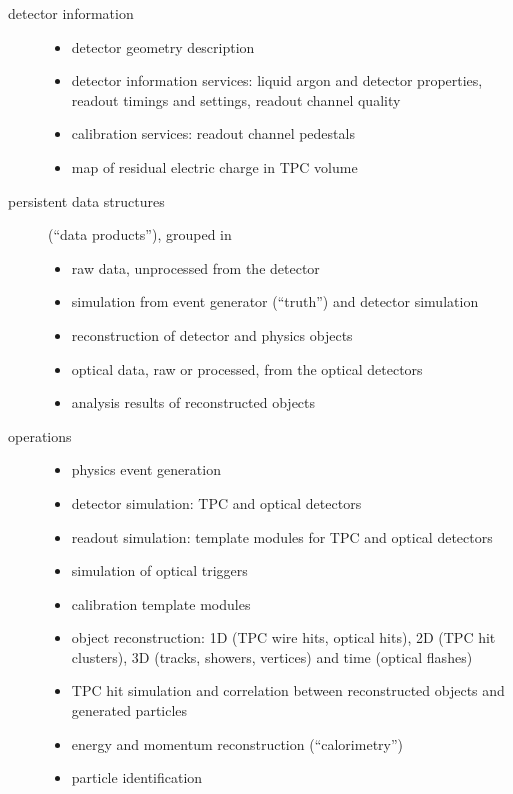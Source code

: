 \begin{description}
   \item[detector information] \mbox{} %
      \begin{itemize}
         \item detector geometry description
         \item detector information services: liquid argon and detector properties, readout timings and settings, readout channel quality
         \item calibration services: readout channel pedestals
         \item map of residual electric charge in TPC volume
      \end{itemize}
   \item[persistent data structures] (``data products''), grouped in
      \begin{itemize}
         \item raw data, unprocessed from the detector
         \item simulation from event generator (``truth'') and detector simulation
         \item reconstruction of detector and physics objects
         \item optical data, raw or processed, from the optical detectors
         \item analysis results of reconstructed objects
      \end{itemize}
   \item[operations] \mbox{} %
      \begin{itemize}
         \item physics event generation
         \item detector simulation: TPC and optical detectors
         \item readout simulation: template modules for TPC and optical detectors
         \item simulation of optical triggers
         \item calibration template modules
         \item object reconstruction: 1D (TPC wire hits, optical hits), 2D (TPC hit clusters), 3D (tracks, showers, vertices) and time (optical flashes)
         \item TPC hit simulation and correlation between reconstructed objects and generated particles
         \item energy and momentum reconstruction (``calorimetry'')
         \item particle identification

\end{itemize}
\end{description}
